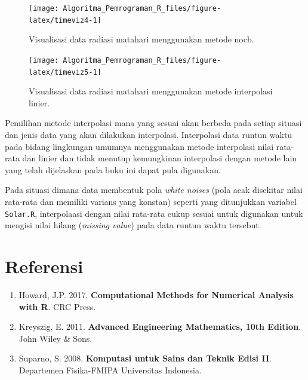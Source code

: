 \documentclass[
]{book}
\providecommand{\tightlist}{%
  \setlength{\itemsep}{0pt}\setlength{\parskip}{0pt}}
\theoremstyle{definition}
\theoremstyle{definition}
\theoremstyle{definition}
\theoremstyle{definition}
\theoremstyle{remark}
\begin{document}
\begin{figure}

{\centering \texttt{[image: Algoritma\_Pemrograman\_R\_files/figure-latex/timeviz4-1]} 

}

\caption{Visualisasi data radiasi matahari menggunakan metode nocb.}\label{fig:timeviz4}
\end{figure}

\begin{figure}

{\centering \texttt{[image: Algoritma\_Pemrograman\_R\_files/figure-latex/timeviz5-1]} 

}

\caption{Visualisasi data radiasi matahari menggunakan metode interpolasi linier.}\label{fig:timeviz5}
\end{figure}

Pemilihan metode interpolasi mana yang sesuai akan berbeda pada setiap situasi dan jenis data yang akan dilakukan interpolasi. Interpolasi data runtun waktu pada bidang lingkungan umumnya menggunakan metode interpolasi nilai rata-rata dan linier dan tidak menutup kemungkinan interpolasi dengan metode lain yang telah dijelaskan pada buku ini dapat pula digunakan.

Pada situasi dimana data membentuk pola \emph{white noises} (pola acak disekitar nilai rata-rata dan memiliki varians yang konstan) seperti yang ditunjukkan variabel \texttt{Solar.R}, interpolaasi dengan nilai rata-rata cukup sesuai untuk digunakan untuk mengisi nilai hilang (\emph{missing value}) pada data runtun waktu tersebut.

\hypertarget{referensi-3}{%
\section{Referensi}\label{referensi-3}}

\begin{enumerate}
\def\labelenumi{\arabic{enumi}.}
\tightlist
\item
  Howard, J.P. 2017. \textbf{Computational Methods for Numerical Analysis with R}. CRC Press.
\item
  Kreyszig, E. 2011. \textbf{Advanced Engineering Mathematics, 10th Edition}. John Wiley \& Sons.
\item
  Suparno, S. 2008. \textbf{Komputasi untuk Sains dan Teknik Edisi II}. Departemen Fisika-FMIPA Universitas Indonesia.
\end{enumerate}
\end{document}
